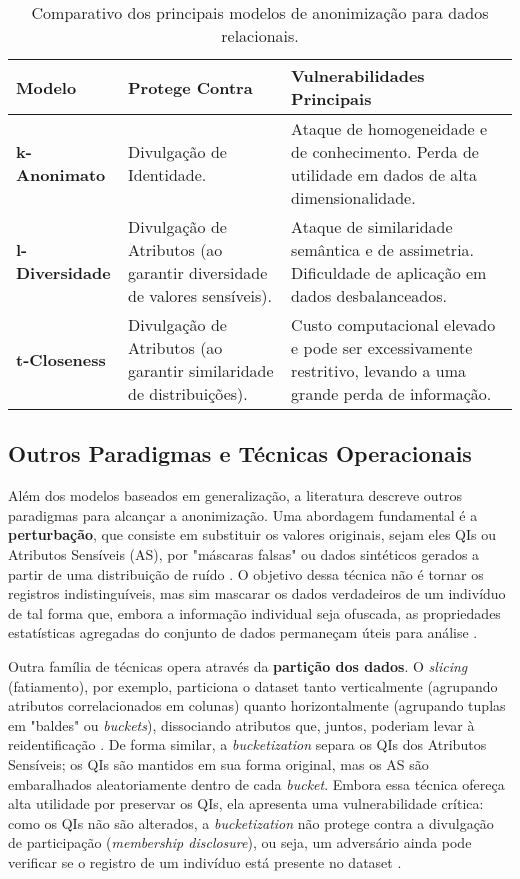 \begin{table}[h!]
\centering
\caption{Comparativo dos principais modelos de anonimização para dados relacionais.}
\label{tab:modelos-comparativo}
\begin{tabular}{|p{}|p{}|p{}|}
\hline
\textbf{Modelo} & \textbf{Protege Contra} & \textbf{Vulnerabilidades Principais} \\ \hline
\textbf{k-Anonimato} & Divulgação de Identidade. & Ataque de homogeneidade e de conhecimento. Perda de utilidade em dados de alta dimensionalidade. \\ \hline
\textbf{l-Diversidade} & Divulgação de Atributos (ao garantir diversidade de valores sensíveis). & Ataque de similaridade semântica e de assimetria. Dificuldade de aplicação em dados desbalanceados. \\ \hline
\textbf{t-Closeness} & Divulgação de Atributos (ao garantir similaridade de distribuições). & Custo computacional elevado e pode ser excessivamente restritivo, levando a uma grande perda de informação. \\ \hline
\end{tabular}
\end{table}

\subsection{Outros Paradigmas e Técnicas Operacionais}
\label{subsec:fund-outros-paradigmas}

Além dos modelos baseados em generalização, a literatura descreve outros paradigmas para alcançar a anonimização. Uma abordagem fundamental é a \textbf{perturbação}, que consiste em substituir os valores originais, sejam eles QIs ou Atributos Sensíveis (AS), por "máscaras falsas" ou dados sintéticos gerados a partir de uma distribuição de ruído \cite{Olatunji2024}. O objetivo dessa técnica não é tornar os registros indistinguíveis, mas sim mascarar os dados verdadeiros de um indivíduo de tal forma que, embora a informação individual seja ofuscada, as propriedades estatísticas agregadas do conjunto de dados permaneçam úteis para análise \cite{Vovk2023}.

Outra família de técnicas opera através da \textbf{partição dos dados}. O \textit{slicing} (fatiamento), por exemplo, particiona o dataset tanto verticalmente (agrupando atributos correlacionados em colunas) quanto horizontalmente (agrupando tuplas em "baldes" ou \textit{buckets}), dissociando atributos que, juntos, poderiam levar à reidentificação \cite{Olatunji2024}. De forma similar, a \textit{bucketization} separa os QIs dos Atributos Sensíveis; os QIs são mantidos em sua forma original, mas os AS são embaralhados aleatoriamente dentro de cada \textit{bucket}. Embora essa técnica ofereça alta utilidade por preservar os QIs, ela apresenta uma vulnerabilidade crítica: como os QIs não são alterados, a \textit{bucketization} não protege contra a divulgação de participação (\textit{membership disclosure}), ou seja, um adversário ainda pode verificar se o registro de um indivíduo está presente no dataset \cite{Olatunji2024}.

